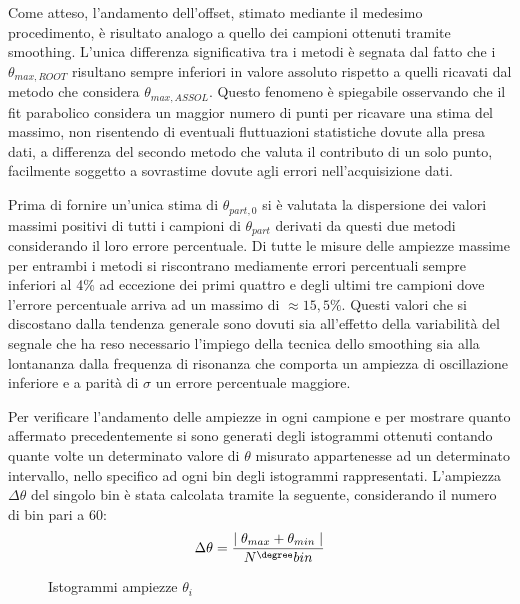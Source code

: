 \documentclass[a4paper,11pt,oneside]{article}
\begin{document}
Come atteso, l'andamento dell'offset, stimato mediante il medesimo procedimento, è risultato analogo a quello dei campioni ottenuti tramite smoothing. L'unica differenza significativa tra i metodi è segnata dal fatto che i $\theta_{max, ROOT}$ risultano sempre inferiori in valore assoluto rispetto a quelli ricavati dal metodo che considera $\theta_{max, ASSOL}$. Questo fenomeno è spiegabile osservando che il fit parabolico considera un maggior numero di punti per ricavare una stima del massimo, non risentendo di eventuali fluttuazioni statistiche dovute alla presa dati, a differenza del secondo metodo che valuta il contributo di un solo punto, facilmente soggetto a sovrastime dovute agli errori nell'acquisizione dati.\newline

Prima di fornire un'unica stima di $\theta_{part, 0}$ si è valutata la dispersione dei valori massimi positivi di tutti i campioni di $\theta_{part}$ derivati da questi due metodi considerando il loro errore percentuale. Di tutte le misure delle ampiezze massime per entrambi i metodi si riscontrano mediamente errori percentuali sempre inferiori al 4\% ad eccezione dei primi quattro e degli ultimi tre campioni dove l'errore percentuale arriva ad un massimo di $\approx 15,5\%$. Questi valori che si discostano dalla tendenza generale sono dovuti sia all'effetto della variabilità del segnale che ha reso necessario l'impiego della tecnica dello smoothing sia alla lontananza dalla frequenza di risonanza che comporta un ampiezza di oscillazione inferiore e a parità di $\sigma$ un errore percentuale maggiore.\newline

Per verificare l'andamento delle ampiezze in ogni campione e per mostrare quanto affermato precedentemente si sono generati degli istogrammi ottenuti contando quante volte un determinato valore di $\theta$ misurato appartenesse ad un determinato intervallo, nello specifico ad ogni bin degli istogrammi rappresentati. L'ampiezza $\Delta \theta$ del singolo bin è stata calcolata tramite la seguente, considerando il numero di bin pari a $60$:
\begin{equation*}
    \Delta \theta=\frac{\mid\theta_{max} + \theta_{min}\mid}{N^{\degree} bin} 
\end{equation*}

\begin{figure}[h!]
    \centering
    \caption{Istogrammi ampiezze $\theta_{i}$}
\end{figure}
\end{document}
